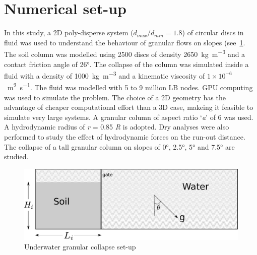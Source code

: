 \documentclass[epj,twocolumn]{webofc}
\begin{document}
\section{Numerical set-up}
In this study, a 2D poly-disperse system ($d_{max} / d_{min} = 1.8$) of
circular discs in fluid was used to understand the behaviour of granular
flows on slopes (see~\cref{fig:geometry}.
The soil column was modelled using 2500 discs of density
2650~\si{\kilogram\per\meter\cubed} and a contact friction angle of
26\si{\degree}.  The  collapse of the column was simulated inside a fluid
with a density of 1000~\si{\kilogram\per\meter\cubed} and a kinematic viscosity
of $1 \times 10^{-6}$~\si{\meter\squared\per\second}. The fluid was modelled
with 5 to 9 million LB nodes. GPU computing was used to simulate the problem.
The choice of a 2D geometry has the advantage of cheaper computational
effort than a 3D case, makeing it feasible to simulate very large systems.
A granular column of aspect ratio `\textit{a}' of 6 was used. A hydrodynamic
radius of \textit{r} = 0.85 \textit{R} is adopted. Dry analyses were also
performed to study the effect of hydrodynamic forces on the run-out distance.
The collapse of a tall granular column on slopes of 0\si{\degree},
2.5\si{\degree}, 5\si{\degree} and 7.5\si{\degree} are studied.

\begin{figure}
  \centering
  \includegraphics[width=0.95\linewidth]{figs/geometry}
  \caption{Underwater granular collapse set-up}
  \label{fig:geometry}
\end{figure}
\end{document}
